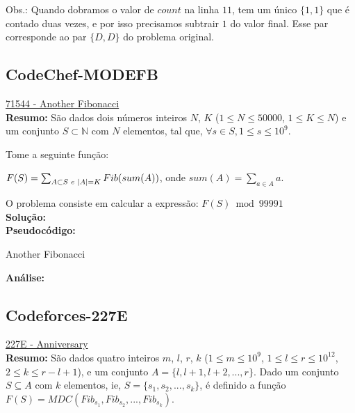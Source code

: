 Obs.: Quando dobramos o valor de $count$ na linha $11$, tem um único $\{1,1\}$ que é contado duas vezes, e por isso precisamos subtrair $1$ do valor final. 
Esse par corresponde ao par $\{D,D\}$ do problema original.




\subsection{CodeChef-MODEFB}
\href{https://www.codechef.com/problems/MOREFB}{71544 - Another Fibonacci}\\

\textbf{Resumo:}
São dados dois números inteiros $N$, $K$ ($1 \leq N \leq 50000$, $1 \leq K \leq N$) e um conjunto $S \subset \mathbb{N}$ com $N$ elementos, tal que, $\forall s \in S, 1 \leq s \leq 10^9$.

Tome a seguinte função:

$F(S) = \sum_{A \subset S \hspace{1mm} e\hspace{1mm} |A| = K}^{} Fib(sum(A))$, onde $sum(A) = \sum_{a \in A}a$. %

O problema consiste em calcular a expressão:  
$F(S) \bmod 99991 $
\\

\textbf{Solução:}
\\

\textbf{Pseudocódigo:}
\begin{algorithm}
\caption{Another Fibonacci}
\begin{algorithmic}[1]

\EndProcedure
\end{algorithmic}
\end{algorithm}


\textbf{Análise:}




\subsection{Codeforces-227E}
\href{http://codeforces.com/contest/227/problem/E}{227E - Anniversary}\\

\textbf{Resumo:}
São dados quatro inteiros $m$, $l$, $r$, $k$ ($1\leq m\leq 10^9$, $1\leq l \leq r \leq 10^{12}$, $2\leq k\leq r-l+1$), 
e um conjunto $A = \{l,l+1,l+2,...,r\}$.
Dado um conjunto $S \subseteq A$ com $k$ elementos, ie, $S = \{s_1, s_2,...,s_k\}$, é definido a função 
$F(S) = MDC(Fib_{s_1}, Fib_{s_2}, ..., Fib_{s_k})$.

